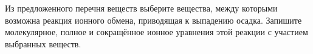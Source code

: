 Из предложенного перечня веществ выберите вещества, между которыми возможна реакция ионного обмена, приводящая к выпадению осадка. Запишите молекулярное, полное и сокращённое ионное уравнения этой реакции с участием выбранных веществ.